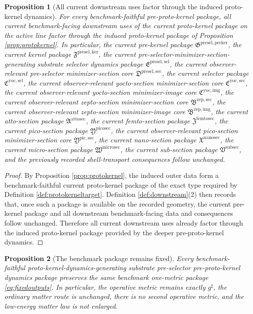 \documentclass[11pt]{article}
\newcommand{\CompletedMetric}{g^{\sharp}}
\newcommand{\SubSectionPackage}{\mathfrak V^{\mathrm{subsec}}}
\newcommand{\MicroSectionPackage}{\mathfrak W^{\mathrm{microsec}}}
\newcommand{\NanoSectionPackage}{\mathfrak X^{\mathrm{nanosec}}}
\newcommand{\PicoSectionPackage}{\mathfrak Y^{\mathrm{picosec}}}
\newcommand{\PicoMinSectionCore}{\mathfrak Y^{\mathrm{pic,sec}}}
\newcommand{\FemtoSectionPackage}{\mathfrak Z^{\mathrm{femtosec}}}
\newcommand{\AttoSectionPackage}{\mathfrak A^{\mathrm{attosec}}}
\newcommand{\ZeptoImageCore}{\mathfrak B^{\mathrm{zep,img}}}
\newcommand{\ZeptoMinSectionCore}{\mathfrak B^{\mathrm{zep,sec}}}
\newcommand{\YoctoImageCore}{\mathfrak C^{\mathrm{yoc,img}}}
\newcommand{\YoctoMinSectionCore}{\mathfrak C^{\mathrm{yoc,sec}}}
\newcommand{\YoctoSelectorPackage}{\mathfrak C^{\mathrm{yoc,sel}}}
\newcommand{\PreSelectorMinSectionCore}{\mathfrak D^{\mathrm{presel,sec}}}
\newcommand{\PreSectionSelectorPackage}{\mathfrak E^{\mathrm{presel,sel}}}
\newcommand{\KernelPackage}{\mathfrak F^{\mathrm{presel,ker}}}
\newcommand{\PreKernelPackage}{\mathfrak G^{\mathrm{presel,preker}}}
\newtheorem{proposition}{Proposition}
\begin{document}
\begin{proposition}[All current downstream uses factor through the induced proto-kernel dynamics]
\label{prop:downstream}
For every benchmark-faithful pre-proto-kernel package, all current benchmark-facing downstream uses of the current proto-kernel package on the active line factor through the induced proto-kernel package of Proposition \ref{prop:protokernel}. In particular, the current pre-kernel package \(\PreKernelPackage\), the current kernel package \(\KernelPackage\), the current pre-selector-minimizer-section-generating substrate selector dynamics package \(\PreSectionSelectorPackage\), the current observer-relevant pre-selector minimizer-section core \(\PreSelectorMinSectionCore\), the current selector package \(\YoctoSelectorPackage\), the current observer-relevant yocto-section minimizer-section core \(\YoctoMinSectionCore\), the current observer-relevant yocto-section minimizer-image core \(\YoctoImageCore\), the current observer-relevant zepto-section minimizer-section core \(\ZeptoMinSectionCore\), the current observer-relevant zepto-section minimizer-image core \(\ZeptoImageCore\), the current atto-section package \(\AttoSectionPackage\), the current femto-section package \(\FemtoSectionPackage\), the current pico-section package \(\PicoSectionPackage\), the current observer-relevant pico-section minimizer-section core \(\PicoMinSectionCore\), the current nano-section package \(\NanoSectionPackage\), the current micro-section package \(\MicroSectionPackage\), the current sub-section package \(\SubSectionPackage\), and the previously recorded shell-transport consequences follow unchanged.
\end{proposition}

\begin{proof}
By Proposition \ref{prop:protokernel}, the induced outer data form a benchmark-faithful current proto-kernel package of the exact type required by Definition \ref{def:protokerneltarget}. Definition \ref{def:downstream}(2) then records that, once such a package is available on the recorded geometry, the current pre-kernel package and all downstream benchmark-facing data and consequences follow unchanged. Therefore all current downstream uses already factor through the induced proto-kernel package provided by the deeper pre-proto-kernel dynamics.
\end{proof}

\begin{proposition}[The benchmark package remains fixed]
\label{prop:benchmark}
Every benchmark-faithful proto-kernel-dynamics-generating substrate pre-selector pre-proto-kernel dynamics package preserves the same benchmark one-metric package \eqref{eq:fixedoutputs}. In particular, the operative metric remains exactly \(\CompletedMetric\), the ordinary matter route is unchanged, there is no second operative metric, and the low-energy matter law is not enlarged.
\end{proposition}
\end{document}
